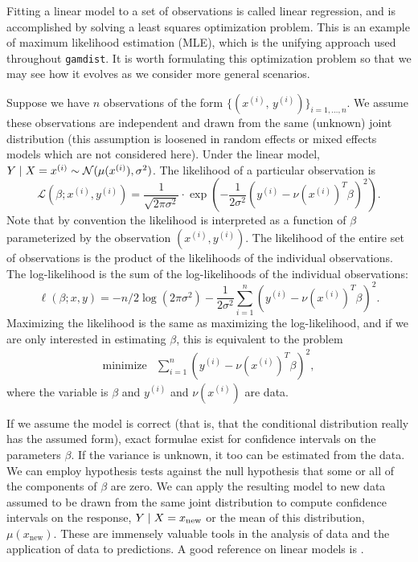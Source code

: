 \documentclass[12pt]{article}
\begin{document}
Fitting a linear model to a set of observations is called linear regression, and is accomplished by solving a least squares optimization problem. This is an example of maximum likelihood estimation (MLE), which is the unifying approach used throughout \texttt{gamdist}. It is worth formulating this optimization problem so that we may see how it evolves as we consider more general scenarios.

Suppose we have $n$ observations of the form $\{ (x^{(i)}, \,y^{(i)} ) \}_{i=1, \ldots, n}$. We assume these observations are independent and drawn from the same (unknown) joint distribution (this assumption is loosened in random effects or mixed effects models which are not considered here). Under the linear model, $Y \; | \; X = x^{(i)} \sim {\mathcal N} (\mu(x^{(i)}), \sigma^2)$. The likelihood of a particular observation is
\begin{displaymath}
    \mathcal{L}(\beta; x^{(i)}, y^{(i)}) = \frac{1}{\sqrt{2\pi \sigma^2}} \cdot \exp\left( -\frac{1}{2 \sigma^2} \left(y^{(i)} - \nu \left( x^{(i)} \right)^T \beta \right)^2 \right).
\end{displaymath}
Note that by convention the likelihood is interpreted as a function of $\beta$ parameterized by the observation $(x^{(i)}, y^{(i)})$. The likelihood of the entire set of observations is the product of the likelihoods of the individual observations. The log-likelihood is the sum of the log-likelihoods of the individual observations:
\begin{displaymath}
   \ell(\beta; x, y) = -n/2 \log(2\pi \sigma^2) - \frac{1}{2\sigma^2} \sum_{i=1}^n \left( y^{(i)} - \nu \left(x^{(i)} \right)^T \beta \right)^2.
\end{displaymath}
Maximizing the likelihood is the same as maximizing the log-likelihood, and if we are only interested in estimating $\beta$, this is equivalent to the problem
\begin{displaymath}
        \begin{array}{ll}
            \mbox{minimize} & \sum_{i=1}^n \left( y^{(i)} - \nu \left(x^{(i)} \right)^T \beta \right)^2,
        \end{array}
\end{displaymath}
where the variable is $\beta$ and $y^{(i)}$ and $\nu(x^{(i)})$ are data.

If we assume the model is correct (that is, that the conditional distribution really has the assumed form), exact formulae exist for confidence intervals on the parameters $\beta$. If the variance is unknown, it too can be estimated from the data. We can employ hypothesis tests against the null hypothesis that some or all of the components of $\beta$ are zero. We can apply the resulting model to new data assumed to be drawn from the same joint distribution to compute confidence intervals on the response, $Y \; | \; X = x_\textrm{new}$ or the mean of this distribution, $\mu(x_\textrm{new})$. These are immensely valuable tools in the analysis of data and the application of data to predictions. A good reference on linear models is \cite{Weisberg:2005}.
\end{document}
